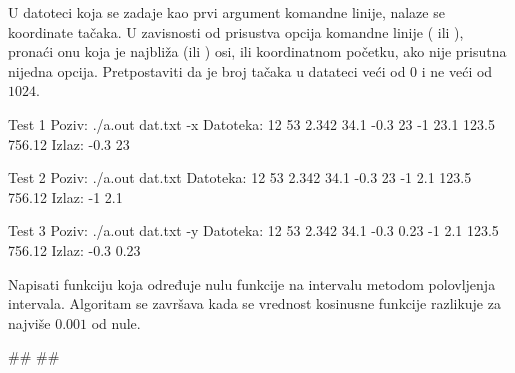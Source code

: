 \begin{Answer}[ref=404]
\end{Answer}
\begin{Exercise}[label=405]
  U datoteci koja se zadaje kao prvi argument komandne linije, nalaze
  se koordinate tačaka. U zavisnosti od prisustva opcija komandne
  linije ( ili ), pronaći onu koja je najbliža
   (ili ) osi, ili koordinatnom početku, ako nije
  prisutna nijedna opcija. Pretpostaviti da je broj tačaka u datateci
  veći od $0$ i ne veći od $1024$.
  
\begin{minitest}
\begin{test}{Test 1}
Poziv: ./a.out dat.txt -x
Datoteka:
  12 53
  2.342 34.1
  -0.3 23
  -1 23.1
  123.5 756.12
Izlaz:
  -0.3 23
\end{test}
\end{minitest}
\begin{minitest}
\begin{test}{Test 2}
Poziv: ./a.out dat.txt 
Datoteka:
  12 53
  2.342 34.1
  -0.3 23
  -1 2.1
  123.5 756.12
Izlaz:
  -1 2.1
\end{test}
\end{minitest}
\begin{minitest}
\begin{test}{Test 3}
Poziv: ./a.out dat.txt -y
Datoteka:
  12 53
  2.342 34.1
  -0.3 0.23
  -1 2.1
  123.5 756.12
Izlaz:
  -0.3 0.23
\end{test}
\end{minitest}


\end{Exercise}

\begin{Answer}[ref=405]
\end{Answer}
\begin{Exercise}[label=406]
  Napisati funkciju koja određuje nulu funkcije  na
  intervalu \argf{[0,2]} metodom polovljenja intervala. Algoritam se
  završava kada se vrednost kosinusne funkcije razlikuje za najviše
  $0.001$ od nule. 
  
\begin{minitest}
\begin{test}{1}
#\naslovIzlaz#
##
\end{test}
\end{minitest}


\end{Exercise}

